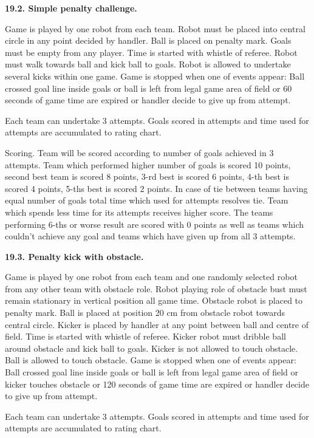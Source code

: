 \documentclass[a4paper]{article}
\begin{document}
\bigskip

\textbf{19.2. Simple penalty challenge.}

Game is played by one robot from each team. Robot must be placed into central circle in any point decided by handler.
Ball is placed on penalty mark. Goals must be empty from any player. Time is started with whistle of referee. Robot
must walk towards ball and kick ball to goals. Robot is allowed to undertake several kicks within one game. Game is
stopped when one of events appear: Ball crossed goal line inside goals or ball is left from legal game area of field or
60 seconds of game time are expired or handler decide to give up from attempt.

Each team can undertake 3 attempts. Goals scored in attempts and time used for attempts are accumulated to rating chart.


Scoring. Team will be scored according to number of goals achieved in 3 attempts. Team which performed higher number of
goals is scored 10 points, second best team is scored 8 points, 3-rd best is scored 6 points, 4-th best is scored 4
points, 5-ths best is scored 2 points. In case of tie between teams having equal number of goals total time which used
for attempts resolves tie. Team which spends less time for its attempts receives higher score. The teams performing
6-ths or worse result are scored with 0 points as well as teams which couldn’t achieve any goal and teams
which have given up from all 3 attempts.

\bigskip

\textbf{19.3. Penalty kick with obstacle. }

Game is played by one robot from each team and one randomly selected robot from any other team with obstacle role. Robot
playing role of obstacle bust must remain stationary in vertical position all game time. Obstacle robot is placed to
penalty mark. Ball is placed at position 20 cm from obstacle robot towards central circle. Kicker is placed by handler
at any point between ball and centre of field. Time is started with whistle of referee. Kicker robot must dribble ball
around obstacle and kick ball to goals. Kicker is not allowed to touch obstacle. Ball is allowed to touch obstacle.
Game is stopped when one of events appear: Ball crossed goal line inside goals or ball is left from legal game area of
field or kicker touches obstacle or 120 seconds of game time are expired or handler decide to give up from attempt.

Each team can undertake 3 attempts. Goals scored in attempts and time used for attempts are accumulated to rating chart.
\end{document}
